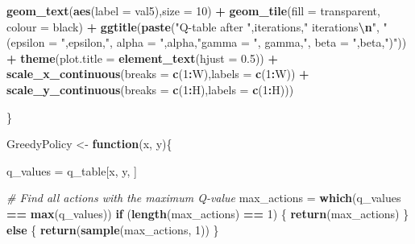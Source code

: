\documentclass[
]{article}
\newenvironment{Shaded}{\begin{snugshade}}{\end{snugshade}}
\newcommand{\AttributeTok}[1]{\textcolor[rgb]{0.13,0.29,0.53}{#1}}
\newcommand{\CommentTok}[1]{\textcolor[rgb]{0.56,0.35,0.01}{\textit{#1}}}
\newcommand{\ControlFlowTok}[1]{\textcolor[rgb]{0.13,0.29,0.53}{\textbf{#1}}}
\newcommand{\DecValTok}[1]{\textcolor[rgb]{0.00,0.00,0.81}{#1}}
\newcommand{\FloatTok}[1]{\textcolor[rgb]{0.00,0.00,0.81}{#1}}
\newcommand{\FunctionTok}[1]{\textcolor[rgb]{0.13,0.29,0.53}{\textbf{#1}}}
\newcommand{\NormalTok}[1]{#1}
\newcommand{\OtherTok}[1]{\textcolor[rgb]{0.56,0.35,0.01}{#1}}
\newcommand{\SpecialCharTok}[1]{\textcolor[rgb]{0.81,0.36,0.00}{\textbf{#1}}}
\newcommand{\StringTok}[1]{\textcolor[rgb]{0.31,0.60,0.02}{#1}}
\begin{document}
\begin{Shaded}
\begin{Highlighting}[]
          \FunctionTok{geom\_text}\NormalTok{(}\FunctionTok{aes}\NormalTok{(}\AttributeTok{label =}\NormalTok{ val5),}\AttributeTok{size =} \DecValTok{10}\NormalTok{) }\SpecialCharTok{+}
          \FunctionTok{geom\_tile}\NormalTok{(}\AttributeTok{fill =} \StringTok{\textquotesingle{}transparent\textquotesingle{}}\NormalTok{, }\AttributeTok{colour =} \StringTok{\textquotesingle{}black\textquotesingle{}}\NormalTok{) }\SpecialCharTok{+} 
          \FunctionTok{ggtitle}\NormalTok{(}\FunctionTok{paste}\NormalTok{(}\StringTok{"Q{-}table after "}\NormalTok{,iterations,}\StringTok{" iterations}\SpecialCharTok{\textbackslash{}n}\StringTok{"}\NormalTok{,}
                        \StringTok{"(epsilon = "}\NormalTok{,epsilon,}\StringTok{", alpha = "}\NormalTok{,alpha,}\StringTok{"gamma = "}\NormalTok{,}
\NormalTok{                        gamma,}\StringTok{", beta = "}\NormalTok{,beta,}\StringTok{")"}\NormalTok{)) }\SpecialCharTok{+}
          \FunctionTok{theme}\NormalTok{(}\AttributeTok{plot.title =} \FunctionTok{element\_text}\NormalTok{(}\AttributeTok{hjust =} \FloatTok{0.5}\NormalTok{)) }\SpecialCharTok{+}
          \FunctionTok{scale\_x\_continuous}\NormalTok{(}\AttributeTok{breaks =} \FunctionTok{c}\NormalTok{(}\DecValTok{1}\SpecialCharTok{:}\NormalTok{W),}\AttributeTok{labels =} \FunctionTok{c}\NormalTok{(}\DecValTok{1}\SpecialCharTok{:}\NormalTok{W)) }\SpecialCharTok{+}
          \FunctionTok{scale\_y\_continuous}\NormalTok{(}\AttributeTok{breaks =} \FunctionTok{c}\NormalTok{(}\DecValTok{1}\SpecialCharTok{:}\NormalTok{H),}\AttributeTok{labels =} \FunctionTok{c}\NormalTok{(}\DecValTok{1}\SpecialCharTok{:}\NormalTok{H)))}

\NormalTok{\}}

\NormalTok{GreedyPolicy }\OtherTok{\textless{}{-}} \ControlFlowTok{function}\NormalTok{(x, y)\{}

\NormalTok{  q\_values }\OtherTok{=}\NormalTok{ q\_table[x, y, ]}
  
  \CommentTok{\# Find all actions with the maximum Q{-}value}
\NormalTok{  max\_actions }\OtherTok{=} \FunctionTok{which}\NormalTok{(q\_values }\SpecialCharTok{==} \FunctionTok{max}\NormalTok{(q\_values))}
  \ControlFlowTok{if}\NormalTok{ (}\FunctionTok{length}\NormalTok{(max\_actions) }\SpecialCharTok{==} \DecValTok{1}\NormalTok{) \{}
    \FunctionTok{return}\NormalTok{(max\_actions)}
\NormalTok{  \} }\ControlFlowTok{else}\NormalTok{ \{}
    \FunctionTok{return}\NormalTok{(}\FunctionTok{sample}\NormalTok{(max\_actions, }\DecValTok{1}\NormalTok{))}
\NormalTok{  \}}
  

\end{Highlighting}
\end{Shaded}
\end{document}
